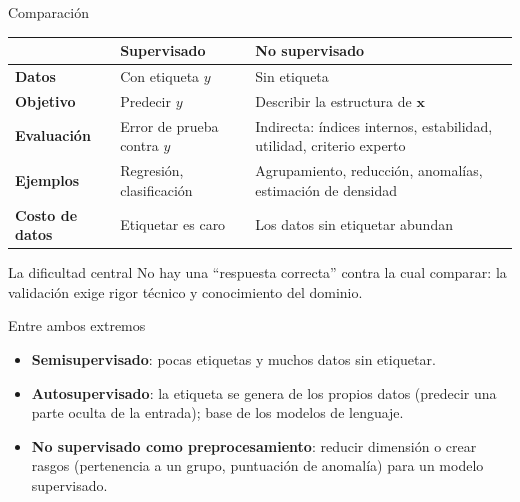 \documentclass[aspectratio=169,11pt]{beamer}
\newcommand{\x}{\bm{x}}
\begin{document}
\begin{frame}{Comparación}
  \renewcommand{\arraystretch}{1.3}
  \begin{tabular}{@{}>{\bfseries}p{}>{\raggedright\arraybackslash}p{}>{\raggedright\arraybackslash}p{}@{}}
    \toprule
    & \textbf{Supervisado} & \textbf{No supervisado}\\
    \midrule
    Datos & Con etiqueta $y$ & Sin etiqueta \\
    Objetivo & Predecir $y$ & Describir la estructura de $\x$ \\
    Evaluación & Error de prueba contra $y$ & Indirecta: índices internos, estabilidad, utilidad, criterio experto \\
    Ejemplos & Regresión, clasificación & Agrupamiento, reducción, anomalías, estimación de densidad \\
    Costo de datos & Etiquetar es caro & Los datos sin etiquetar abundan \\
    \bottomrule
  \end{tabular}
  \vspace{2pt}
  \begin{alertblock}{La dificultad central}
    No hay una ``respuesta correcta'' contra la cual comparar: la validación
    exige rigor técnico y conocimiento del dominio.
  \end{alertblock}
\end{frame}

\begin{frame}{Entre ambos extremos}
  \begin{itemize}
    \item \textbf{Semisupervisado}: pocas etiquetas y muchos datos sin etiquetar.
    \item \textbf{Autosupervisado}: la etiqueta se genera de los propios datos
          (predecir una parte oculta de la entrada); base de los modelos de lenguaje.
    \item \textbf{No supervisado como preprocesamiento}: reducir dimensión o crear rasgos
          (pertenencia a un grupo, puntuación de anomalía) para un modelo supervisado.
  \end{itemize}
\end{frame}
\end{document}
